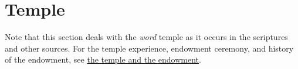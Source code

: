 \section{Temple}
	\label{TEMPLE}

	Note that this section deals with the \textit{word} temple as it occurs in the scriptures and other sources. For the temple experience, endowment ceremony, and history of the endowment, see \hyperref[TEMPLE-ENDOWMENT]{the temple and the endowment}.





	

	

